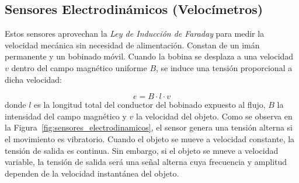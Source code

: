 \begin{marginfigure}[0em]
    \caption[Principio del sensor fotovoltaico.]{Operación de un sensor fotovoltaico. La energía de los fotones genera portadores de carga que dan lugar a la corriente de fotodiodo $I_{ph}$.}\label{fig:celda_fotovoltaica}
\end{marginfigure}


\subsection{Sensores Electrodinámicos (Velocímetros)}

Estos sensores aprovechan la \emph{Ley de Inducción de Faraday} para medir la velocidad mecánica sin necesidad de alimentación. Constan de un imán permanente y un bobinado móvil. Cuando la bobina se desplaza a una velocidad $v$ dentro del campo magnético uniforme $B$, se induce una tensión proporcional a dicha velocidad:

\begin{equation}\label{eq:fem_velocidad}
    e = B \cdot l \cdot v
\end{equation}
donde $l$ es la longitud total del conductor del bobinado expuesto al flujo, $B$ la intensidad del campo magnético y $v$ la velocidad del objeto. Como se observa en la Figura~\ref{fig:sensores_electrodinamicos}, el sensor genera una tensión alterna si el movimiento es vibratorio.
Cuando el objeto se mueve a velocidad constante, la tensión de salida es continua. Sin embargo, si el objeto se mueve a velocidad variable, la tensión de salida será una señal alterna cuya frecuencia y amplitud dependen de la velocidad instantánea del objeto.



